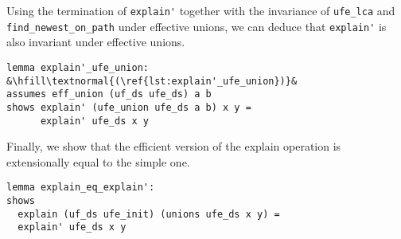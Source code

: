 \documentclass[
  sigplan,
  10pt,
  anonymous,
  review,
  ]{acmart}
\begin{document}
Using the termination of \lstinline|explain'| together with the invariance of \lstinline|ufe_lca| and \lstinline|find_newest_on_path| under effective unions, we can deduce that \lstinline|explain'| is also invariant under effective unions.
\begin{lstlisting}[caption={[empty]}, label={lst:explain'_ufe_union}]
lemma explain'_ufe_union: &\hfill\textnormal{(\ref{lst:explain'_ufe_union})}&
assumes eff_union (uf_ds ufe_ds) a b
shows explain' (ufe_union ufe_ds a b) x y =
      explain' ufe_ds x y
\end{lstlisting}
Finally, we show that the efficient version of the explain operation is extensionally equal to the simple one.
\begin{lstlisting}
lemma explain_eq_explain':
shows
  explain (uf_ds ufe_init) (unions ufe_ds x y) =
  explain' ufe_ds x y
\end{lstlisting}
\end{document}
